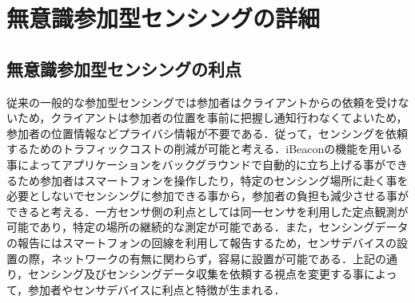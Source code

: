 \documentclass[submit,techrep]{ipsj}
\begin{document}


\section{無意識参加型センシングの詳細}


\subsection{無意識参加型センシングの利点}
従来の一般的な参加型センシングでは参加者はクライアントからの依頼を受けないため，クライアントは参加者の位置を事前に把握し通知行わなくてよいため，参加者の位置情報などプライバシ情報が不要である．従って，センシングを依頼するためのトラフィックコストの削減が可能と考える．iBeaconの機能を用いる事によってアプリケーションをバックグラウンドで自動的に立ち上げる事ができるため参加者はスマートフォンを操作したり，特定のセンシング場所に赴く事を必要としないでセンシングに参加できる事から，参加者の負担も減少させる事ができると考える．一方センサ側の利点としては同一センサを利用した定点観測が可能であり，特定の場所の継続的な測定が可能である．また，センシングデータの報告にはスマートフォンの回線を利用して報告するため，センサデバイスの設置の際，ネットワークの有無に関わらず，容易に設置が可能である．上記の通り，センシング及びセンシングデータ収集を依頼する視点を変更する事によって，参加者やセンサデバイスに利点と特徴が生まれる．



\end{document}
